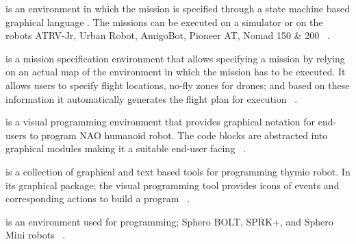 \parhead{\missionlab} is an environment in which the mission is specified through a state machine based graphical language . The missions can be executed on a simulator or on the robots ATRV-Jr, Urban Robot, AmigoBot, Pioneer AT, Nomad 150 \& 200  ~\cite{arkin2002missionlab,Ulam2007}.%

\parhead{\flyaq} is a mission specification environment that allows specifying a mission by relying on an actual map of the environment in which the mission has to be executed. It allows users to specify  flight locations, no-fly zones for drones; and  based on these information it automatically generates the flight plan for execution ~\cite{FLYAQ,DiRuscio2014,Bozhinoski2016}.%

\parhead{\tivipe} is a visual programming environment that provides graphical notation for end-users to program NAO humanoid robot. The code blocks are abstracted into graphical modules making it a suitable end-user facing ~\cite{TiViPE}.  %

\parhead{\aseba} is a collection of graphical and text based tools for programming thymio robot. In its graphical package; the visual programming tool provides icons of events and corresponding actions to build a program ~\cite{ASEBA,Magnenat2011}. %

\parhead{\sphero} is an environment used for programming; Sphero BOLT, SPRK+, and Sphero Mini robots ~\cite{Sphero}. %

